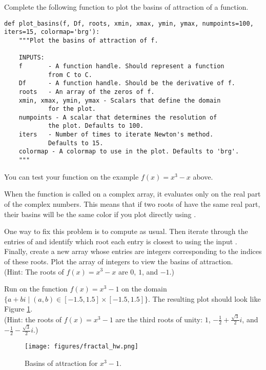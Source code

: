 \begin{problem}
Complete the following function to plot the basins of attraction of a function.

\begin{lstlisting}
def plot_basins(f, Df, roots, xmin, xmax, ymin, ymax, numpoints=100, iters=15, colormap='brg'):
    """Plot the basins of attraction of f.

    INPUTS:
    f       - A function handle. Should represent a function
            from C to C.
    Df      - A function handle. Should be the derivative of f.
    roots   - An array of the zeros of f.
    xmin, xmax, ymin, ymax - Scalars that define the domain
            for the plot.
    numpoints - A scalar that determines the resolution of
            the plot. Defaults to 100.
    iters   - Number of times to iterate Newton's method.
            Defaults to 15.
    colormap - A colormap to use in the plot. Defaults to 'brg'.
    """
\end{lstlisting}

You can test your function on the example $f(x) = x^3-x$ above.

When the function  is called on a complex array, it evaluates only on the real part of the complex numbers.
This means that if two roots of  have the same real part, their basins will be the same color if you plot directly using .

One way to fix this problem is to compute  as usual.
Then iterate through the entries of  and identify which root each entry is closest to using the input .
Finally, create a new array whose entries are integers corresponding to the indices of these roots.
Plot the array of integers to view the basins of attraction.
\\ (Hint: The roots of $f(x) = x^3-x$ are $0$, $1$, and $-1$.)
\end{problem}

\begin{problem}

Run  on the function $f(x) = x^3-1$ on the domain $\{a+bi \mid (a, b) \in [-1.5, 1.5] \times [-1.5, 1.5] \}$.
The resulting plot should look like Figure \ref{fig:fractal_hw}.
\\ (Hint: the roots of $f(x) = x^3-1$ are the third roots of unity: $1$, $-\frac{1}{2} + \frac{\sqrt{3}}{2}i$, and $-\frac{1}{2} - \frac{\sqrt{3}}{2}i$.)

\begin{figure}[H]
    \centering
    \texttt{[image: figures/fractal\_hw.png]}
    \caption{Basins of attraction for $x^3-1$.}
    \label{fig:fractal_hw}
\end{figure}
\end{problem}

